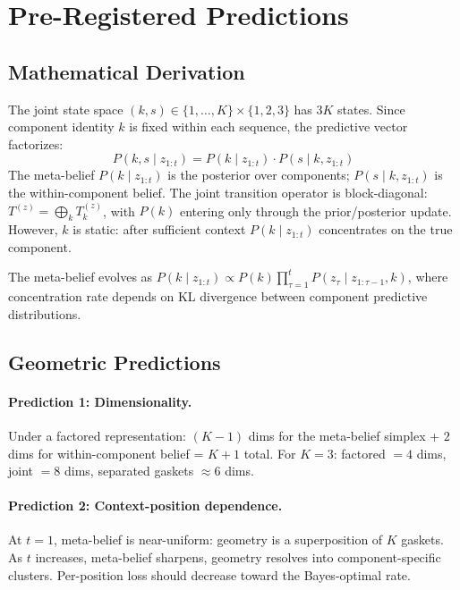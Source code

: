 \section{Pre-Registered Predictions}
\label{sec:predictions}

\subsection{Mathematical Derivation}

The joint state space $(k, s) \in \{1,\ldots,K\} \times \{1,2,3\}$ has $3K$ states. Since component identity $k$ is fixed within each sequence, the predictive vector factorizes:
\begin{equation}
    P(k, s \mid z_{1:t}) = P(k \mid z_{1:t}) \cdot P(s \mid k, z_{1:t})
\end{equation}
The meta-belief $P(k \mid z_{1:t})$ is the posterior over components; $P(s \mid k, z_{1:t})$ is the within-component belief. The joint transition operator is block-diagonal: $T^{(z)} = \bigoplus_k T_k^{(z)}$, with $P(k)$ entering only through the prior/posterior update. However, $k$ is static: after sufficient context $P(k \mid z_{1:t})$ concentrates on the true component.

The meta-belief evolves as $P(k \mid z_{1:t}) \propto P(k) \prod_{\tau=1}^{t} P(z_\tau \mid z_{1:\tau-1}, k)$, where concentration rate depends on KL divergence between component predictive distributions.

\subsection{Geometric Predictions}

\paragraph{Prediction 1: Dimensionality.} Under a factored representation: $(K{-}1)$ dims for the meta-belief simplex + $2$ dims for within-component belief = $K{+}1$ total. For $K{=}3$: factored $= 4$ dims, joint $= 8$ dims, separated gaskets $\approx 6$ dims.

\paragraph{Prediction 2: Context-position dependence.} At $t{=}1$, meta-belief is near-uniform: geometry is a superposition of $K$ gaskets. As $t$ increases, meta-belief sharpens, geometry resolves into component-specific clusters. Per-position loss should decrease toward the Bayes-optimal rate.

